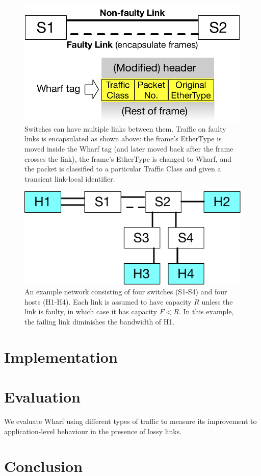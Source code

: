 \documentclass[sigconf]{acmart}
\newcommand{\OurSys}{Wharf\xspace}
\begin{document}
\begin{figure}
  \centering
  \includegraphics[width=0.4\paperwidth]{header_format.pdf}
  \caption{\label{fig:format}Switches can have multiple links between them.
  Traffic on faulty links is encapsulated as shown above: the frame's EtherType
  is moved inside the \OurSys tag (and later moved back after the frame crosses
  the link), the frame's EtherType is changed to \OurSys, and the packet is
  classified to a particular Traffic Class and given a transient link-local
  identifier.}
\end{figure}


\begin{figure}
  \centering
  \includegraphics[width=0.3\paperwidth]{example_network.pdf}
  \caption{\label{fig:example-net}An example network consisting of four
  switches (S1-S4) and four hosts (H1-H4). Each link is assumed to have
  capacity $R$ unless the link is faulty, in which case it has capacity $F < R$.
  In this example, the failing link diminishes the bandwidth of H1.}
\end{figure}


\section{Implementation}
\section{Evaluation}
We evaluate \OurSys using different types of traffic to measure its improvement
to application-level behaviour in the presence of lossy links.


\section{Conclusion}



\end{document}
